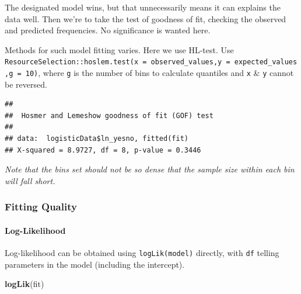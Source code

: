 \documentclass[
]{ctexart}
\newenvironment{Shaded}{\begin{snugshade}}{\end{snugshade}}
\newcommand{\AttributeTok}[1]{\textcolor[rgb]{0.13,0.29,0.53}{#1}}
\newcommand{\DecValTok}[1]{\textcolor[rgb]{0.00,0.00,0.81}{#1}}
\newcommand{\FunctionTok}[1]{\textcolor[rgb]{0.13,0.29,0.53}{\textbf{#1}}}
\newcommand{\NormalTok}[1]{#1}
\newcommand{\SpecialCharTok}[1]{\textcolor[rgb]{0.81,0.36,0.00}{\textbf{#1}}}
\begin{document}
The designated model wins, but that unnecessarily means it can explains
the data well. Then we're to take the test of goodness of fit, checking
the observed and predicted frequencies. No significance is wanted here.

Methods for such model fitting varies. Here we use HL-test. Use
\texttt{ResourceSelection::hoslem.test(x\ =\ observed\_values,y\ =\ expected\_values,g\ =\ 10)},
where \texttt{g} is the number of bins to calculate quantiles and
\texttt{x} \& \texttt{y} cannot be reversed.

\begin{Shaded}
\end{Shaded}

\begin{verbatim}
## 
##  Hosmer and Lemeshow goodness of fit (GOF) test
## 
## data:  logisticData$ln_yesno, fitted(fit)
## X-squared = 8.9727, df = 8, p-value = 0.3446
\end{verbatim}

\emph{Note that the bins set should not be so dense that the sample size
within each bin will fall short.}

\hypertarget{fitting-quality}{%
\subsubsection{Fitting Quality}\label{fitting-quality}}

\hypertarget{log-likelihood}{%
\paragraph{Log-Likelihood}\label{log-likelihood}}

Log-likelihood can be obtained using \texttt{logLik(model)} directly,
with \texttt{df} telling parameters in the model (including the
intercept).

\begin{Shaded}
\begin{Highlighting}[]
\FunctionTok{logLik}\NormalTok{(fit)}
\end{Highlighting}
\end{Shaded}
\end{document}
